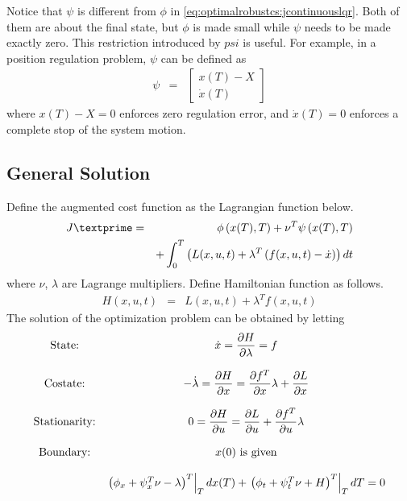 Notice that $\psi$ is different from $\phi$ in \eqref{eq:optimalrobustcs:jcontinuouslqr}. Both of them are about the final state, but $\phi$ is made small while $\psi$ needs to be made exactly zero. This restriction introduced by $psi$ is useful. For example, in a position regulation problem, $\psi$ can be defined as
\begin{eqnarray}
	\psi &=& \left[\begin{array}{c}
		x(T) - X \\ \dot{x}(T)
	\end{array}\right] \nonumber
\end{eqnarray}
where $x(T) - X=0$ enforces zero regulation error, and $\dot{x}(T)=0$ enforces a complete stop of the system motion.

\subsection{General Solution}

Define the augmented cost function as the Lagrangian function below.
\begin{eqnarray}
	J\textprime &=& \phi\left(x(T),T\right) + \nu^T\psi\left(x(T),T\right) \nonumber \\
	&& + \int_{0}^{T}\left(L(x, u, t) + \lambda^T\left(f(x, u, t) - \dot{x}\right)\right)dt \nonumber
\end{eqnarray}
where $\nu$, $\lambda$ are Lagrange multipliers. Define Hamiltonian function as follows.
\begin{eqnarray}
	H(x,u,t) &=& L(x, u, t) + \lambda^Tf(x, u, t) \nonumber
\end{eqnarray}
The solution of the optimization problem can be obtained by letting
\begin{eqnarray}
	\begin{array}{cc}
		\textup{State:} & \dot{x} = \dfrac{\partial H}{\partial \lambda} = f \\ & \\
		\textup{Costate:} & -\dot{\lambda} = \dfrac{\partial H}{\partial x} = \dfrac{\partial f^T}{\partial x}\lambda + \dfrac{\partial L}{\partial x} \\ & \\
		\textup{Stationarity:} & 0 = \dfrac{\partial H}{\partial u} = \dfrac{\partial L}{\partial u} + \dfrac{\partial f^T}{\partial u}\lambda \\ & \\
		\textup{Boundary:} & x(0)\textup{~is given} \\ & \\
		& \left.\left(\phi_x+\psi_x^T\nu-\lambda\right)^T\right|_{T}dx(T) + \left.\left(\phi_t+\psi_t^T\nu+H\right)^T\right|_{T}dT = 0
	\end{array} \nonumber
\end{eqnarray}

